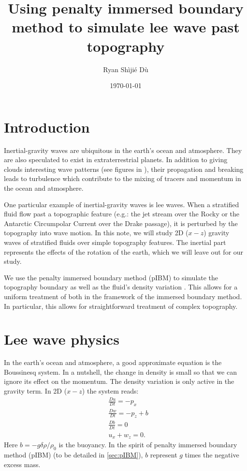 \documentclass[11pt,letterpaper]{article}
\title{Using penalty immersed boundary method to simulate lee wave past topography}
\author{Ryan Sh\`iji\'e D\`u}
\date{\today}
\begin{document}
\maketitle

\section{Introduction}
Inertial-gravity waves are ubiquitous in the earth's ocean and atmosphere. They are also speculated to exist in extraterrestrial planets. In addition to giving clouds interesting wave patterns (see figures in \cite{YigitMedvedev_19}), their propagation and breaking leads to turbulence which contribute to the mixing of tracers and momentum in the ocean and atmosphere. 

One particular example of inertial-gravity waves is lee waves. When a stratified fluid flow past a topographic feature (e.g.: the jet stream over the Rocky or the Antarctic Circumpolar Current over the Drake passage), it is perturbed by the topography into wave motion. In this note, we will study 2D ($x-z$) gravity waves of stratified fluids over simple topography features. The inertial part represents the effects of the rotation of the earth, which we will leave out for our study. 

We use the penalty immersed boundary method (pIBM) to simulate the topography boundary as well as the fluid's density variation \parencite{KimPeskin_16}. This allows for a uniform treatment of both in the framework of the immersed boundary method. In particular, this allows for straightforward treatment of complex topography. 

\section{Lee wave physics}
In the earth's ocean and atmosphere, a good approximate equation is the Boussinesq system. In a nutshell, the change in density is small so that we can ignore its effect on the momentum. The density variation is only active in the gravity term. In 2D ($x-z$) the system reads:
\begin{align}
    &\frac{Du}{Dt} = -p_x\\
    &\frac{Dw}{Dt} = -p_z+b\\
    &\frac{Db}{Dt} = 0 \label{eq:bouy_eq} \\
    &u_x+w_z = 0.
\end{align}
Here $b = -g\delta\rho/\rho_0$ is the buoyancy. In the spirit of penalty immersed boundary method (pIBM) (to be detailed in \ref{sec:pIBM}), $b$ represent $g$ times the negative excess mass. 
\end{document}
